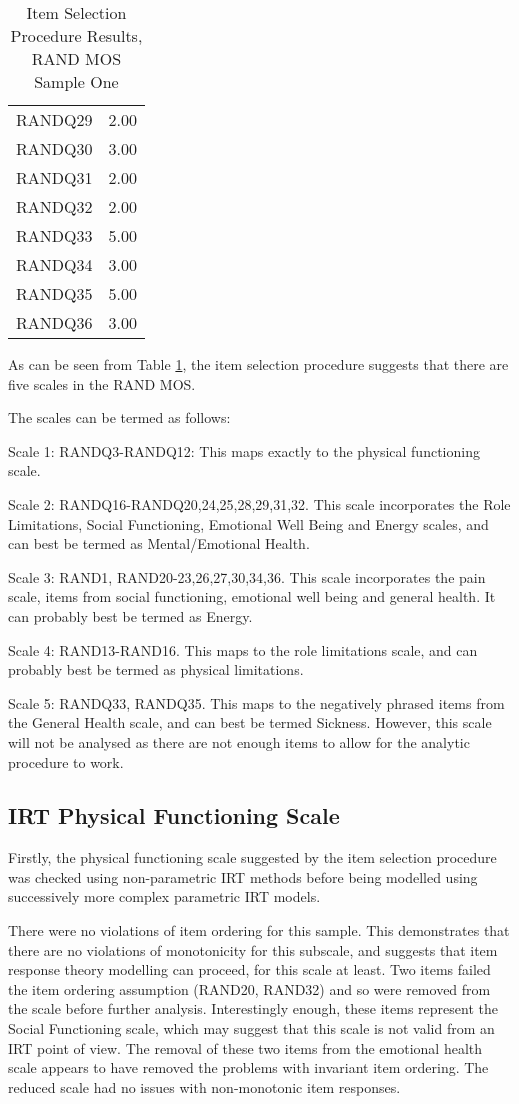 \documentclass{article}
\begin{document}
\begin{table}[ht]
\begin{tabular}{rr}
  RANDQ29 & 2.00 \\ 
  RANDQ30 & 3.00 \\ 
  RANDQ31 & 2.00 \\ 
  RANDQ32 & 2.00 \\ 
  RANDQ33 & 5.00 \\ 
  RANDQ34 & 3.00 \\ 
  RANDQ35 & 5.00 \\ 
  RANDQ36 & 3.00 \\ 
   \hline
\end{tabular}
\caption{Item Selection Procedure Results, RAND MOS Sample One} 
\label{tab:randscales}
\end{table}As can be seen from Table \ref{tab:randscales}, the item selection procedure suggests that there are five scales in the RAND MOS.  


The scales can be termed as follows:

Scale 1: RANDQ3-RANDQ12: This maps exactly to the physical functioning scale.

Scale 2: RANDQ16-RANDQ20,24,25,28,29,31,32. This scale incorporates the Role Limitations, Social Functioning, Emotional Well Being and Energy scales, and can best be termed as Mental/Emotional Health.

Scale 3: RAND1, RAND20-23,26,27,30,34,36. This scale incorporates the pain scale, items from social functioning, emotional well being and general health. It can probably best be termed as Energy.

Scale 4: RAND13-RAND16. This maps to the role limitations scale, and can probably best be termed as physical limitations.

Scale 5:  RANDQ33, RANDQ35. This maps to the negatively phrased items from the General Health scale, and can best be termed Sickness. However, this scale will not be analysed as there are not enough items to allow for the analytic procedure to work.


\subsection{IRT Physical Functioning Scale}
\label{sec:irt-phys-funct}

Firstly, the physical functioning scale suggested by the item selection procedure was checked using non-parametric IRT methods before being modelled using successively more complex parametric IRT models. 




There were no violations of item ordering for this sample.  This demonstrates that there are no violations of monotonicity for this subscale, and suggests that item response theory modelling can proceed, for this scale at least. Two items failed the item ordering assumption (RAND20, RAND32) and so were removed from the scale before further analysis. Interestingly enough, these items represent the Social Functioning scale, which may suggest that this scale is not valid from an IRT point of view.  The removal of  these two items from the emotional health scale appears to have removed the problems with invariant item ordering. The reduced scale had no issues with non-monotonic item responses. 
\end{document}
